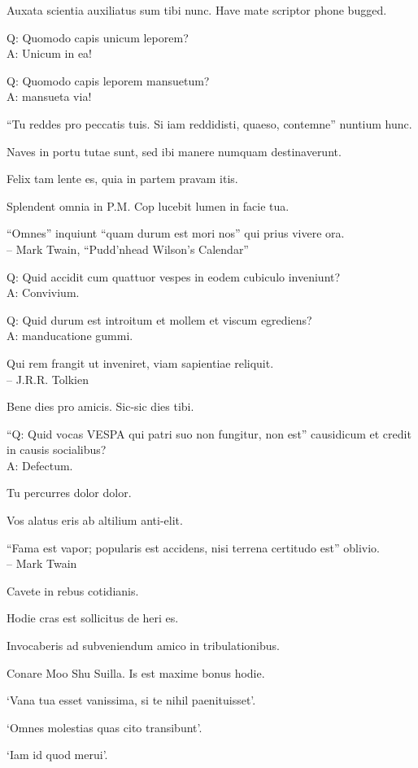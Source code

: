 \documentclass[titlepage,12pt]{memoir}
\begin{document}
Auxata scientia auxiliatus sum tibi nunc. Have mate scriptor phone bugged.

Q: Quomodo capis unicum leporem?\\
A: Unicum in ea!

Q: Quomodo capis leporem mansuetum?\\
A: mansueta via!

“Tu reddes pro peccatis tuis. Si iam reddidisti, quaeso, contemne”
nuntium hunc.

Naves in portu tutae sunt, sed ibi manere numquam destinaverunt.

Felix tam lente es, quia in partem pravam itis.

Splendent omnia in P.M. Cop lucebit lumen in facie tua.

“Omnes” inquiunt “quam durum est mori nos”
qui prius vivere ora.
\\-- Mark Twain, “Pudd’nhead Wilson’s Calendar”

Q: Quid accidit cum quattuor vespes in eodem cubiculo inveniunt?\\
A: Convivium.

Q: Quid durum est introitum et mollem et viscum egrediens?\\
A: manducatione gummi.

Qui rem frangit ut inveniret, viam sapientiae reliquit.
\\-- J.R.R. Tolkien

Bene dies pro amicis.
Sic-sic dies tibi.

“Q: Quid vocas VESPA qui patri suo non fungitur, non est”
causidicum et credit in causis socialibus?\\
A: Defectum.

Tu percurres dolor dolor.

Vos alatus eris ab altilium anti-elit.

“Fama est vapor; popularis est accidens, nisi terrena certitudo est”
oblivio.
\\-- Mark Twain

Cavete in rebus cotidianis.

Hodie cras est sollicitus de heri es.

Invocaberis ad subveniendum amico in tribulationibus.

Conare Moo Shu Suilla. Is est maxime bonus hodie.

‘Vana tua esset vanissima, si te nihil paenituisset’.

‘Omnes molestias quas cito transibunt’.

‘Iam id quod merui’.
\end{document}
